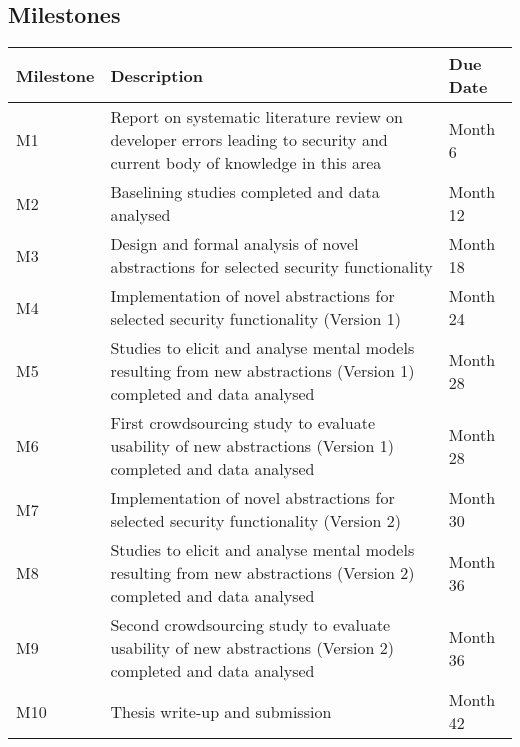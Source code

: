 \documentclass[10pt]{article}
\begin{document}
\vspace{-\baselineskip}


\subsection*{Milestones} 



\begin{tabular}{|p{2cm}|p{12cm}|p{2cm}|}
\hline
\textbf{Milestone} & \textbf{Description} & \textbf{Due Date}\\
\hline
\hline
M1 & Report on systematic literature review on developer errors leading to security and current body of knowledge in this area & Month 6\\
\hline
M2 & Baselining studies completed and data analysed & Month 12\\
\hline
M3 & Design and formal analysis of novel abstractions for selected security functionality & Month 18\\
\hline
M4 & Implementation of novel abstractions for selected security functionality (Version 1) & Month 24\\
\hline
M5 & Studies to elicit and analyse mental models resulting from new abstractions (Version 1) completed and data analysed  & Month 28\\
\hline
M6 & First crowdsourcing study to evaluate usability of new abstractions (Version 1) completed and data analysed & Month 28\\
\hline
M7 & Implementation of novel abstractions for selected security functionality (Version 2) & Month 30\\
\hline
M8 & Studies to elicit and analyse mental models resulting from new abstractions (Version 2) completed and data analysed  & Month 36\\
\hline
M9 & Second crowdsourcing study to evaluate usability of new abstractions (Version 2) completed and data analysed & Month 36\\
\hline
M10 & Thesis write-up and submission & Month 42\\
\hline
\end{tabular}


\iffalse
\end{document}
